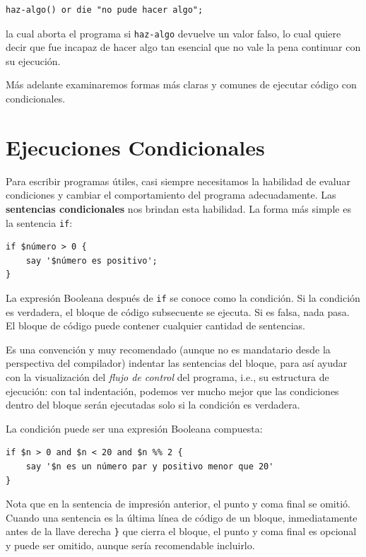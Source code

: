 \begin{lstlisting}
haz-algo() or die "no pude hacer algo";
\end{lstlisting}
%
la cual aborta el programa si {\tt haz-algo} devuelve un 
valor falso, lo cual quiere decir que fue incapaz de hacer 
algo tan esencial que no vale la pena continuar con su
ejecución.

Más adelante examinaremos formas más claras y comunes
de ejecutar código con condicionales.

\section{Ejecuciones Condicionales}
\label{conditional.execution}

Para escribir programas útiles, casi siempre necesitamos la habilidad 
de evaluar condiciones y cambiar el comportamiento del programa
adecuadamente. Las {\bf sentencias condicionales} nos brindan esta
habilidad. La forma más simple es la sentencia {\tt if}:

\begin{lstlisting}
if $número > 0 {
    say '$número es positivo';
}
\end{lstlisting}
%
La expresión Booleana después de {\tt if} se conoce 
como la condición. Si la condición es verdadera, el
bloque de código subsecuente se ejecuta. Si es falsa, 
nada pasa. El bloque de código puede contener cualquier
cantidad de sentencias.

Es una convención y muy recomendado (aunque no es mandatario
desde la perspectiva del compilador) indentar las sentencias
del bloque, para así ayudar con la visualización del 
\emph{flujo de control} del programa, i.e., su estructura
de ejecución: con tal indentación, podemos ver mucho mejor 
que las condiciones dentro del bloque serán ejecutadas solo 
si la condición es verdadera.

La condición puede ser una expresión Booleana compuesta:
\begin{lstlisting}
if $n > 0 and $n < 20 and $n %% 2 {
    say '$n es un número par y positivo menor que 20'
}
\end{lstlisting}
%
Nota que en la sentencia de impresión anterior, el punto y coma
final se omitió. Cuando una sentencia es la última línea de
código de un bloque, inmediatamente antes de la llave derecha
{\tt \}} que cierra el bloque, el punto y coma final es opcional
y puede ser omitido, aunque sería recomendable incluirlo.


